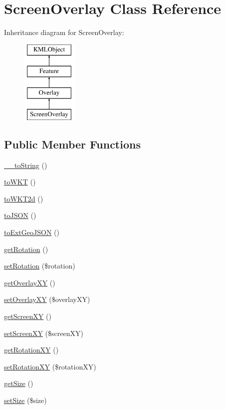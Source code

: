 \hypertarget{classScreenOverlay}{
\section{ScreenOverlay Class Reference}
\label{d8/d18/classScreenOverlay}
}
Inheritance diagram for ScreenOverlay:\begin{figure}[H]
\begin{center}
\leavevmode
\includegraphics[height=4.000000cm]{d8/d18/classScreenOverlay}
\end{center}
\end{figure}
\subsection*{Public Member Functions}
\begin{DoxyCompactItemize}
\item 
\hyperlink{classScreenOverlay_a3c23e4315345c16233d8eeec1eb4aa7d}{\_\-\_\-toString} ()
\item 
\hyperlink{classScreenOverlay_a334b2283d680453b5cb4621fb8c423bb}{toWKT} ()
\item 
\hyperlink{classScreenOverlay_aad6bac79e6dc928796dbc6733c857a83}{toWKT2d} ()
\item 
\hyperlink{classScreenOverlay_ad5a3fc99a4795dd34096056f6cf1a3a0}{toJSON} ()
\item 
\hyperlink{classScreenOverlay_a36be95ebb9618d89f98d4691c40f62ac}{toExtGeoJSON} ()
\item 
\hyperlink{classScreenOverlay_a66e85d05b1ea2eda3c0f7cbf5da0380e}{getRotation} ()
\item 
\hyperlink{classScreenOverlay_ac83b3cb591e1c6d856c9f263545148b5}{setRotation} (\$rotation)
\item 
\hyperlink{classScreenOverlay_aac65ffa60a9e9eddb73c5de8e835b612}{getOverlayXY} ()
\item 
\hyperlink{classScreenOverlay_aa03c6d15dbd40e4f60f58af68ea2ab4e}{setOverlayXY} (\$overlayXY)
\item 
\hyperlink{classScreenOverlay_a21add1af174d8bb147b4d178df996f1a}{getScreenXY} ()
\item 
\hyperlink{classScreenOverlay_ae232ed55432a18f73b45ae0e0991fff2}{setScreenXY} (\$screenXY)
\item 
\hyperlink{classScreenOverlay_afb3571b1264f819edfac8f70a6744574}{getRotationXY} ()
\item 
\hyperlink{classScreenOverlay_aeb8394d90698c9bc26eae6045b539174}{setRotationXY} (\$rotationXY)
\item 
\hyperlink{classScreenOverlay_ae0231b47aa9cadd3f55a8ee278f6c81d}{getSize} ()
\item 
\hyperlink{classScreenOverlay_ad3079d20d9225afb5c7deb0bd0766938}{setSize} (\$size)
\end{DoxyCompactItemize}


